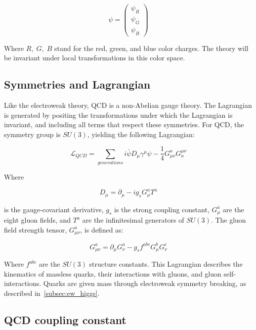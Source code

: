 \begin{equation}\label{eq:qcd-fields}
    \psi = \begin{pmatrix}\psi_R \\ \psi_G \\ \psi_B \end{pmatrix}
\end{equation}

Where $R,\;G,\;B$ stand for the red, green, and blue color charges.
The theory will be invariant under local transformations in this color space.

\subsection{Symmetries and Lagrangian}\label{subsec:qcd_lagrangian}

Like the electroweak theory, QCD is a non-Abelian gauge theory.
The Lagrangian is generated by positing the transformations under which the Lagrangian is invariant,
and including all terms that respect these symmetries.
For QCD, the symmetry group is $SU(3)$, yielding the following Lagrangian:

\begin{equation}\label{eq:qcd-lagrangian}
    \mathcal{L}_{QCD} = \sum_{generations}i\bar{\psi}D_\mu\gamma^\mu\psi-\frac{1}{4}G_{\mu\nu}^a G_a^{\mu\nu}
\end{equation}

Where

\begin{equation}\label{eq:qcd-derivative}
D_\mu = \partial_\mu - i g_s G_\mu^a T^a
\end{equation}

is the gauge-covariant derivative, $g_s$ is the strong coupling constant, $G_\mu^a$ are the eight gluon fields,
and $T^a$ are the infinitesimal generators of $SU(3)$.
The gluon field strength tensor, $G_{\mu\nu}^a$, is defined as:

\begin{equation}\label{eq:qcd-field-strength}
    G_{\mu\nu}^a = \partial_\mu G_\nu^a - g_s f^{abc} G_\mu^b G_\nu ^c
\end{equation}

Where $f^{abc}$ are the $SU(3)$ structure constants.
This Lagrangian describes the kinematics of massless quarks, their interactions with gluons, and gluon self-interactions.
Quarks are given mass through electroweak symmetry breaking, as described in~\ref{subsec:ew_higgs}.

\subsection{QCD coupling constant}\label{subsec:qcd_coupling}

